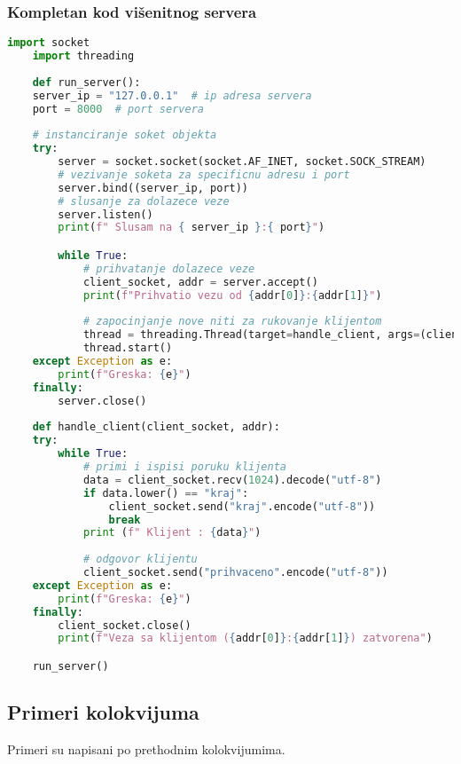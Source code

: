 \subsubsection{Kompletan kod višenitnog servera}

\vspace{0.5cm}

\begin{lstlisting}[language = Python]
    import socket
    import threading
    
    def run_server():
    server_ip = "127.0.0.1"  # ip adresa servera
    port = 8000  # port servera
    
    # instanciranje soket objekta
    try:
        server = socket.socket(socket.AF_INET, socket.SOCK_STREAM)
        # vezivanje soketa za specificnu adresu i port
        server.bind((server_ip, port))
        # slusanje za dolazece veze
        server.listen()
        print(f" Slusam na { server_ip }:{ port}")

        while True:
            # prihvatanje dolazece veze
            client_socket, addr = server.accept()
            print(f"Prihvatio vezu od {addr[0]}:{addr[1]}")
            
            # zapocinjanje nove niti za rukovanje klijentom
            thread = threading.Thread(target=handle_client, args=(client_socket, addr,))
            thread.start()
    except Exception as e:
        print(f"Greska: {e}")
    finally:
        server.close()
        
    def handle_client(client_socket, addr):
    try:
        while True:
            # primi i ispisi poruku klijenta
            data = client_socket.recv(1024).decode("utf-8")
            if data.lower() == "kraj":
                client_socket.send("kraj".encode("utf-8"))
                break
            print (f" Klijent : {data}")
            
            # odgovor klijentu
            client_socket.send("prihvaceno".encode("utf-8"))
    except Exception as e:
        print(f"Greska: {e}")
    finally:
        client_socket.close()
        print(f"Veza sa klijentom ({addr[0]}:{addr[1]}) zatvorena")

    run_server()
\end{lstlisting}

\subsection{Primeri kolokvijuma}

Primeri su napisani po prethodnim kolokvijumima.







